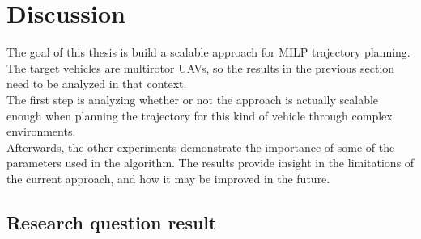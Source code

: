 

\section{Discussion}
The goal of this thesis is build a scalable approach for MILP trajectory planning. The target vehicles are multirotor UAVs, so the results in the previous section need to be analyzed in that context. \\
The first step is analyzing whether or not the approach is actually scalable enough when planning the trajectory for this kind of vehicle through complex environments.\\
Afterwards, the other experiments demonstrate the importance of some of the parameters used in the algorithm. The results provide insight in the limitations of the current approach, and how it may be improved in the future.

\subsection{Research question result}


